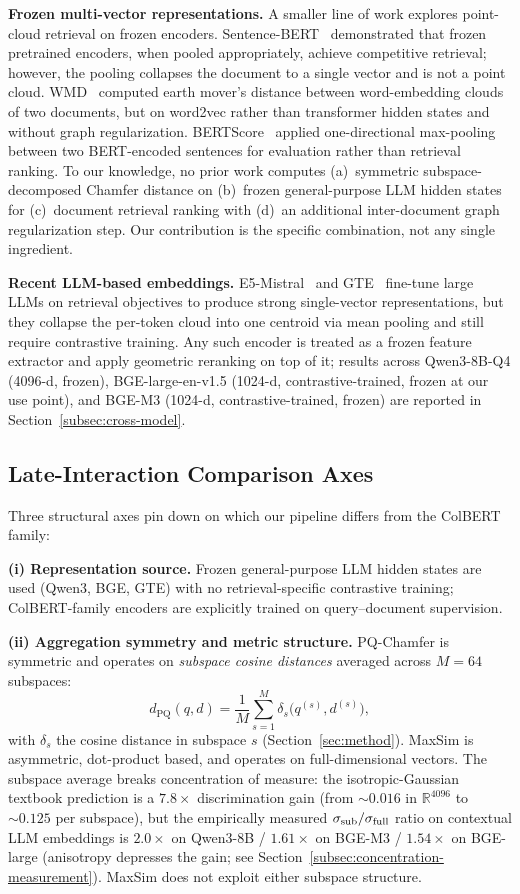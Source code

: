 \documentclass[review,1p]{elsarticle}
\newcommand{\R}{\mathbb{R}}
\begin{document}
\textbf{Frozen multi-vector representations.} A smaller line of work explores point-cloud retrieval on frozen encoders. Sentence-BERT~\citep{reimers2019sbert} demonstrated that frozen pretrained encoders, when pooled appropriately, achieve competitive retrieval; however, the pooling collapses the document to a single vector and is not a point cloud. WMD~\citep{kusner2015wmd} computed earth mover's distance between word-embedding clouds of two documents, but on word2vec rather than transformer hidden states and without graph regularization. BERTScore~\citep{zhang2020bertscore} applied one-directional max-pooling between two BERT-encoded sentences for evaluation rather than retrieval ranking. To our knowledge, no prior work computes (a)~symmetric subspace-decomposed Chamfer distance on (b)~frozen general-purpose LLM hidden states for (c)~document retrieval ranking with (d)~an additional inter-document graph regularization step. Our contribution is the specific combination, not any single ingredient.

\textbf{Recent LLM-based embeddings.} E5-Mistral~\citep{wang2024e5mistral} and GTE~\citep{li2024gte} fine-tune large LLMs on retrieval objectives to produce strong single-vector representations, but they collapse the per-token cloud into one centroid via mean pooling and still require contrastive training. Any such encoder is treated as a frozen feature extractor and apply geometric reranking on top of it; results across Qwen3-8B-Q4 (4096-d, frozen), BGE-large-en-v1.5 (1024-d, contrastive-trained, frozen at our use point), and BGE-M3 (1024-d, contrastive-trained, frozen) are reported in Section~\ref{subsec:cross-model}.

\subsection{Late-Interaction Comparison Axes}
\label{subsec:related-late}

Three structural axes pin down on which our pipeline differs from the ColBERT family:

\textbf{(i) Representation source.} Frozen general-purpose LLM hidden states are used (Qwen3, BGE, GTE) with no retrieval-specific contrastive training; ColBERT-family encoders are explicitly trained on query--document supervision.

\textbf{(ii) Aggregation symmetry and metric structure.} PQ-Chamfer is symmetric and operates on \emph{subspace cosine distances} averaged across $M=64$ subspaces:
\[
d_{\mathrm{PQ}}(q, d) = \frac{1}{M} \sum_{s=1}^{M} \delta_s\bigl(q^{(s)}, d^{(s)}\bigr),
\]
with $\delta_s$ the cosine distance in subspace $s$ (Section~\ref{sec:method}). MaxSim is asymmetric, dot-product based, and operates on full-dimensional vectors. The subspace average breaks concentration of measure: the isotropic-Gaussian textbook prediction is a $7.8\times$ discrimination gain (from ${\sim}0.016$ in $\R^{4096}$ to ${\sim}0.125$ per subspace), but the empirically measured $\sigma_{\rm sub}/\sigma_{\rm full}$ ratio on contextual LLM embeddings is $2.0\times$ on Qwen3-8B / $1.61\times$ on BGE-M3 / $1.54\times$ on BGE-large (anisotropy depresses the gain; see Section~\ref{subsec:concentration-measurement}). MaxSim does not exploit either subspace structure.
\end{document}
